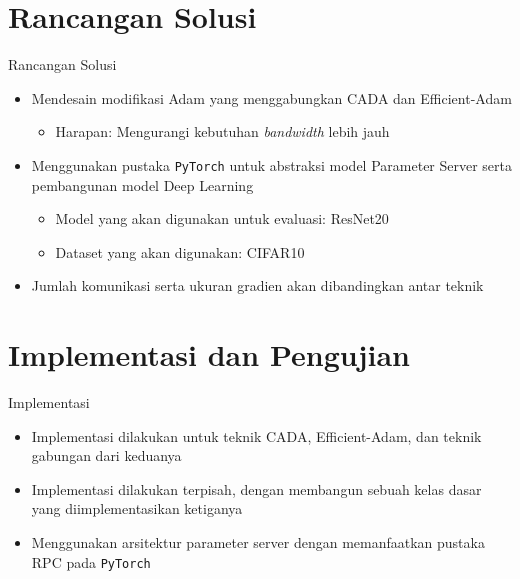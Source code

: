 \documentclass[aspectratio=169]{beamer}
\begin{document}
\section{Rancangan Solusi}
\begin{frame}{Rancangan Solusi}
  \begin{itemize}
    \item Mendesain modifikasi Adam yang menggabungkan CADA \parencite{Chen2021CADA} dan Efficient-Adam \parencite{Chen2022Efficient}
          \begin{itemize}
            \item Harapan: Mengurangi kebutuhan \textit{bandwidth} lebih jauh
          \end{itemize}
    \item Menggunakan pustaka \texttt{PyTorch} untuk abstraksi model Parameter Server serta pembangunan model Deep Learning
          \begin{itemize}
            \item Model yang akan digunakan untuk evaluasi: ResNet20
            \item Dataset yang akan digunakan: CIFAR10
          \end{itemize}
    \item Jumlah komunikasi serta ukuran gradien akan dibandingkan antar teknik
  \end{itemize}
\end{frame}
\section{Implementasi dan Pengujian}
\begin{frame}{Implementasi}
  \begin{itemize}
    \item Implementasi dilakukan untuk teknik CADA, Efficient-Adam, dan teknik gabungan dari keduanya
    \item Implementasi dilakukan terpisah, dengan membangun sebuah kelas dasar yang diimplementasikan ketiganya
    \item Menggunakan arsitektur parameter server dengan memanfaatkan pustaka RPC pada \texttt{PyTorch}
  \end{itemize}
\end{frame}
\end{document}
